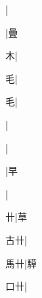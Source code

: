 \begin{multicols}{2}
{{\cjk{}{\cnsym{}　}{\cnsym{}　}{\cnsym{}　}}|{}\par
{\cjk{}{\cnsym{}　}{\cnsym{}　}{\cnsym{}　}}|{\cjk{}曡}\par
{\cjk{}{\cnsym{}　}{\cnsym{}　}木}|{}\par
{\cjk{}{\cnsym{}　}{\cnsym{}　}毛}|{}\par
{\cjk{}{\cnsym{}　}{\cnsym{}　}毛}|{}\par
{\cjk{}{\cnsym{}　}{\cnsym{}　}{\cnsym{}　}}|{}\par
\null\par
{\cjk{}{\cnsym{}　}{\cnsym{}　}{\cnsym{}　}}\mktsJzrVerticalBar{}{\cjk{}{\cnsym{}　}{\cnsym{}　}{\cnsym{}　}}|{}\par
\null\par
{\cjk{}{\cnsym{}　}{\cnsym{}　}{\cnsym{}　}}\mktsJzrVerticalBar{}{\cjk{}{\cnsym{}　}{\cnsym{}　}{\cnsym{}　}}|{\cjk{}早}\par
{}\mktsJzrVerticalBar{}{\cjk{}{\cnsym{}　}{\cnsym{}　}{\cnsym{}　}}|{}\par
{\cjk{}{\cnsym{}　}{\cnsym{}　}卄}\mktsJzrVerticalBar{}{\cjk{}{\cnsym{}　}{\cnsym{}　}{\cnsym{}　}}|{\cjk{}草}\par
{\cjk{}{\cnsym{}　}古卄}\mktsJzrVerticalBar{}{\cjk{}{\cnsym{}　}{\cnsym{}　}{\cnsym{}　}}|{}\par
{\cjk{}{\cnsym{}　}馬卄}\mktsJzrVerticalBar{}{\cjk{}{\cnsym{}　}{\cnsym{}　}{\cnsym{}　}}|{\cjk{}騲}\par
{\cjk{}{\cnsym{}　}口卄}\mktsJzrVerticalBar{}{\cjk{}{\cnsym{}　}{\cnsym{}　}{\cnsym{}　}}|{}\par
}
\end{multicols}
